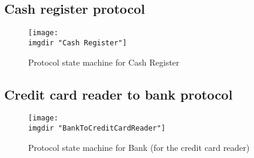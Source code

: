 \subsection{Cash register protocol}
\begin{figure}
  \centering
  \texttt{[image: \\imgdir "Cash Register"]}
  \caption{Protocol state machine for Cash Register}
  \label{fig:lsm:cash_register}
\end{figure}

\subsection{Credit card reader to bank protocol}
\begin{figure}
  \centering
  \texttt{[image: \\imgdir "BankToCreditCardReader"]}
  \caption{Protocol state machine for Bank (for the credit card reader)}
  \label{fig:lsm:ccr_to_bank}
\end{figure}
